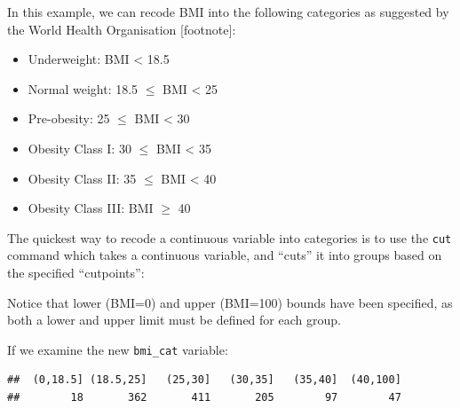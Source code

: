 \documentclass[
]{memoir}
\newenvironment{Shaded}{\begin{snugshade}}{\end{snugshade}}
\newcommand{\DecValTok}[1]{\textcolor[rgb]{0.00,0.00,0.81}{#1}}
\newcommand{\FloatTok}[1]{\textcolor[rgb]{0.00,0.00,0.81}{#1}}
\newcommand{\FunctionTok}[1]{\textcolor[rgb]{0.00,0.00,0.00}{#1}}
\newcommand{\NormalTok}[1]{#1}
\newcommand{\OtherTok}[1]{\textcolor[rgb]{0.56,0.35,0.01}{#1}}
\newcommand{\SpecialCharTok}[1]{\textcolor[rgb]{0.00,0.00,0.00}{#1}}
\providecommand{\tightlist}{%
  \setlength{\itemsep}{0pt}\setlength{\parskip}{0pt}}
\begin{document}
In this example, we can recode BMI into the following categories as suggested by the World Health Organisation {[}footnote{]}:

\begin{itemize}
\tightlist
\item
  Underweight: BMI \textless{} 18.5
\item
  Normal weight: 18.5 \(\le\) BMI \textless{} 25
\item
  Pre-obesity: 25 \(\le\) BMI \textless{} 30
\item
  Obesity Class I: 30 \(\le\) BMI \textless{} 35
\item
  Obesity Class II: 35 \(\le\) BMI \textless{} 40
\item
  Obesity Class III: BMI \(\ge\) 40
\end{itemize}

The quickest way to recode a continuous variable into categories is to use the \texttt{cut} command which takes a continuous variable, and ``cuts'' it into groups based on the specified ``cutpoints'':

\begin{Shaded}
\end{Shaded}

Notice that lower (BMI=0) and upper (BMI=100) bounds have been specified, as both a lower and upper limit must be defined for each group.

If we examine the new \texttt{bmi\_cat} variable:

\begin{Shaded}
\end{Shaded}

\begin{verbatim}
##  (0,18.5] (18.5,25]   (25,30]   (30,35]   (35,40]  (40,100] 
##        18       362       411       205        97        47
\end{verbatim}
\end{document}

